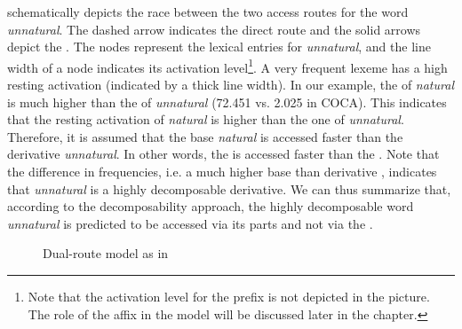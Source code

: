  
 schematically depicts the race between the two access routes for the word \textit{unnatural}. The dashed arrow indicates the direct route and the solid arrows depict the . The nodes represent the lexical entries for \textit{unnatural}, and the line width of a node indicates its activation level\footnote{Note that the activation level for the prefix  is not depicted in the picture. The role of the affix in the model will be discussed later in the chapter.}. A very frequent lexeme has a high resting activation (indicated by a thick line width). In our example, the  of \textit{natural} is much higher than the  of \textit{unnatural} (72.451 vs. 2.025 in  {COCA}). This indicates that the resting activation of \textit{natural} is higher than the one of \textit{unnatural}. Therefore, it is assumed that the base \textit{natural} is accessed faster than the derivative \textit{unnatural}. In other words, the  is accessed faster than the . Note that the difference in frequencies, i.e. a much higher base  than derivative , indicates that \textit{unnatural} is a highly decomposable derivative. We can thus summarize that, according to the decomposability approach, the highly decomposable word \textit{unnatural} is predicted to be accessed via its parts and not via the .

\begin{figure}
\centering
 	\caption{Dual-route model as in \cite{Hay.2001}\label{fig:Dual-route model}} 
 \end{figure}


